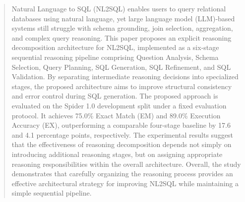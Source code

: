 \documentclass{svproc}
\begin{document}
\begin{abstract}

Natural Language to SQL (NL2SQL) enables users to query relational databases using natural language, yet large language model (LLM)-based systems still struggle with schema grounding, join selection, aggregation, and complex query reasoning. This paper proposes an explicit reasoning decomposition architecture for NL2SQL, implemented as a six-stage sequential reasoning pipeline comprising Question Analysis, Schema Selection, Query Planning, SQL Generation, SQL Refinement, and SQL Validation. By separating intermediate reasoning decisions into specialized stages, the proposed architecture aims to improve structural consistency and error control during SQL generation. The proposed approach is evaluated on the Spider 1.0 development split under a fixed evaluation protocol. It achieves 75.0\% Exact Match (EM) and 89.0\% Execution Accuracy (EX), outperforming a comparable four-stage baseline by 17.6 and 4.1 percentage points, respectively. The experimental results suggest that the effectiveness of reasoning decomposition depends not simply on introducing additional reasoning stages, but on assigning appropriate reasoning responsibilities within the overall architecture. Overall, the study demonstrates that carefully organizing the reasoning process provides an effective architectural strategy for improving NL2SQL while maintaining a simple sequential pipeline.




\end{abstract}
\end{document}
